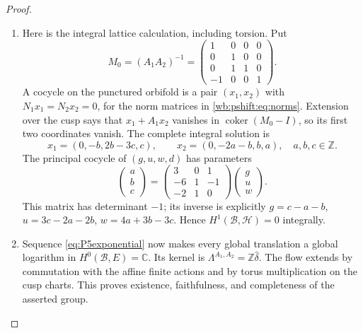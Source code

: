 \begin{proof}
\begin{enumerate}[label=\arabic*.,leftmargin=*]
\item Here is the integral lattice calculation, including torsion.  Put
\[
 M_0=(A_1A_2)^{-1}=\begin{pmatrix}1&0&0&0\\0&1&0&0\\0&1&1&0\\-1&0&0&1\end{pmatrix}.
\]
A cocycle on the punctured orbifold is a pair $(x_1,x_2)$ with
$N_1x_1=N_2x_2=0$, for the norm matrices in
\eqref{wb:pshift:eq:norms}.
Extension over the cusp says that $x_1+A_1x_2$ vanishes in
$\operatorname{coker}(M_0-I)$, so its first two coordinates vanish.
The complete integral solution is
\[
 x_1=(0,-b,2b-3c,c),\qquad x_2=(0,-2a-b,b,a),\quad a,b,c\in\mathbb Z.
\]
The principal cocycle of $(g,u,w,d)$ has parameters
\[
 \begin{pmatrix}a\\b\\c\end{pmatrix}
 =\begin{pmatrix}3&0&1\\-6&1&-1\\-2&1&0\end{pmatrix}
  \begin{pmatrix}g\\u\\w\end{pmatrix}.
\]
This matrix has determinant $-1$; its inverse is explicitly
$g=c-a-b$, $u=3c-2a-2b$, $w=4a+3b-3c$.  Hence
$H^1(\mathcal B,\mathcal H)=0$ integrally.

\item Sequence \eqref{eq:P5exponential} now makes every global translation a
global logarithm in $H^0(\mathcal B,E)=\mathbb C$.  Its kernel is
$\Lambda^{A_1,A_2}=\mathbb Z\widehat\delta$.  The flow extends by
commutation with the affine finite actions and by torus multiplication
on the cusp charts.  This proves existence, faithfulness, and
completeness of the asserted group.
\end{enumerate}
\end{proof}